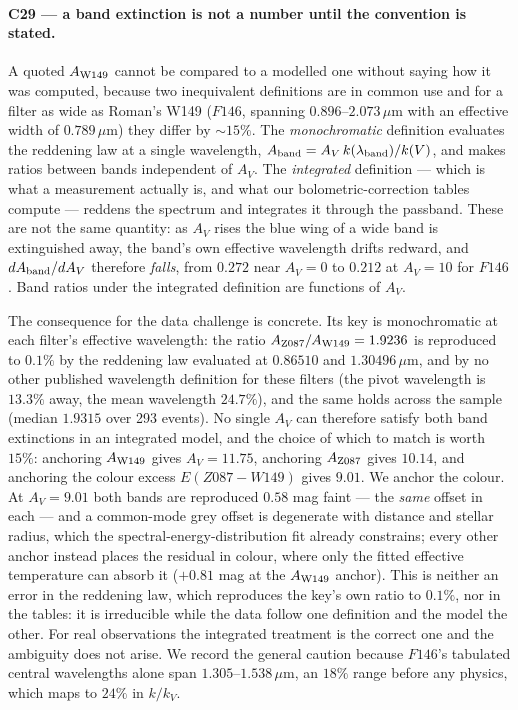 \paragraph{C29 --- a band extinction is not a number until the convention
is stated.}  A quoted $A_{\rm W149}$ cannot be compared to a modelled one
without saying how it was computed, because two inequivalent definitions are
in common use and for a filter as wide as Roman's W149 ($F146$, spanning
$0.896$--$2.073\,\mu$m with an effective width of $0.789\,\mu$m) they differ
by ${\sim}15\%$.  The \emph{monochromatic} definition evaluates the
reddening law at a single wavelength, $A_{\rm band} = A_V\,k(\lambda_{\rm
band})/k(V)$, and makes ratios between bands independent of $A_V$.  The
\emph{integrated} definition --- which is what a measurement actually is,
and what our bolometric-correction tables compute --- reddens the spectrum
and integrates it through the passband.  These are not the same quantity:
as $A_V$ rises the blue wing of a wide band is extinguished away, the band's
own effective wavelength drifts redward, and $dA_{\rm band}/dA_V$ therefore
\emph{falls}, from $0.272$ near $A_V = 0$ to $0.212$ at $A_V = 10$ for
$F146$.  Band ratios under the integrated definition are functions of $A_V$.

The consequence for the data challenge is concrete.  Its key is
monochromatic at each filter's effective wavelength: the ratio $A_{\rm
Z087}/A_{\rm W149} = 1.9236$ is reproduced to $0.1\%$ by the reddening law
evaluated at $0.86510$ and $1.30496\,\mu$m, and by no other published
wavelength definition for these filters (the pivot wavelength is $13.3\%$
away, the mean wavelength $24.7\%$), and the same holds across the sample
(median $1.9315$ over 293 events).  No single $A_V$ can therefore satisfy
both band extinctions in an integrated model, and the choice of which to
match is worth $15\%$: anchoring $A_{\rm W149}$ gives $A_V = 11.75$,
anchoring $A_{\rm Z087}$ gives $10.14$, and anchoring the colour excess
$E(Z087-W149)$ gives $9.01$.  We anchor the colour.  At $A_V = 9.01$ both
bands are reproduced $0.58$ mag faint --- the \emph{same} offset in each ---
and a common-mode grey offset is degenerate with distance and stellar
radius, which the spectral-energy-distribution fit already constrains; every
other anchor instead places the residual in colour, where only the fitted
effective temperature can absorb it ($+0.81$ mag at the $A_{\rm W149}$
anchor).  This is neither an error in the reddening law, which reproduces
the key's own ratio to $0.1\%$, nor in the tables: it is irreducible while
the data follow one definition and the model the other.  For real
observations the integrated treatment is the correct one and the ambiguity
does not arise.  We record the general caution because $F146$'s tabulated
central wavelengths alone span $1.305$--$1.538\,\mu$m, an $18\%$ range
before any physics, which maps to $24\%$ in $k/k_V$.

